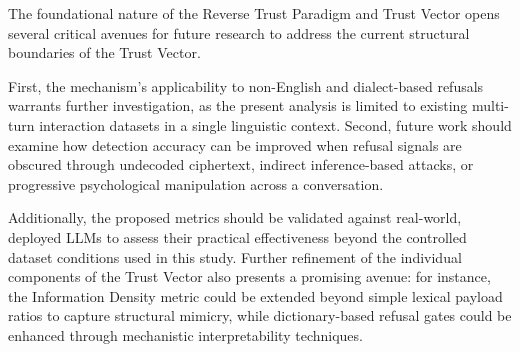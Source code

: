 \documentclass[conference]{IEEEtran}
\begin{document}
The foundational nature of the Reverse Trust Paradigm and Trust Vector opens several critical avenues for future research to address the current structural boundaries of the Trust Vector.

First, the mechanism's applicability to non-English and dialect-based refusals warrants further investigation, as the present analysis is limited to existing multi-turn interaction datasets in a single linguistic context. Second, future work should examine how detection accuracy can be improved when refusal signals are obscured through undecoded ciphertext, indirect inference-based attacks, or progressive psychological manipulation across a conversation.

Additionally, the proposed metrics should be validated against real-world, deployed LLMs to assess their practical effectiveness beyond the controlled dataset conditions used in this study. Further refinement of the individual components of the Trust Vector also presents a promising avenue: for instance, the Information Density metric could be extended beyond simple lexical payload ratios to capture structural mimicry, while dictionary-based refusal gates could be enhanced through mechanistic interpretability techniques.
\end{document}
